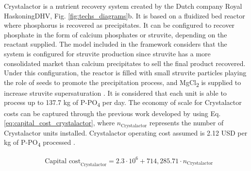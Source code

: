 \begin{refsection}[referencesCh4]
Crystalactor is a nutrient recovery system created by the Dutch company Royal HaskoningDHV, Fig. \ref{fig:techs_diagrams}b. It is based on a fluidized bed reactor where phosphorus is recovered as precipitates. It can be configured to recover phosphate in the form of calcium phosphates or struvite, depending on the reactant supplied. The model included in the framework considers that the system is configured for struvite production since struvite has a more consolidated market than calcium precipitates to sell the final product recovered. Under this configuration, the reactor is filled with small struvite particles playing the role of seeds to promote the precipitation process, and MgCl\textsubscript{2} is supplied to increase struvite supersaturation \citep{egle_phosphorus_2016}.
It is considered that each unit is able to process up to 137.7 kg of P-PO\textsubscript{4} per day. The economy of scale for Crystalactor costs can be captured through the previous work developed by \citet{egle_phosphorus_2016} using Eq. \ref{eq:capital_cost_crystalactor}, where $n_{\text{Crystalactor}}$ represents the number of Crystalactor units installed. Crystalactor operating cost assumed is 2.12 USD per kg of P-PO\textsubscript{4} processed \citep{egle_phosphorus_2016}.

\begin{align}
& \text{Capital cost}_{\text{Crystalactor}}= 2.3 \cdot 10^{6} + 714,285.71 \cdot n_{\text{Crystalactor}} \label{eq:capital_cost_crystalactor}
\end{align}


\end{refsection}
